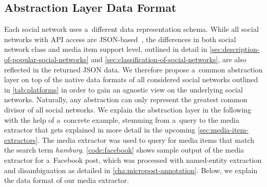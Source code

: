 \subsection{Abstraction Layer Data Format}
\label{sec:data-format}

Each social network uses a~different data representation schema.
While all social networks with API access are
JSON-based~\cite{crockford2006json}, the differences in both 
social network class and media item support level,
outlined in detail in
\autoref{sec:description-of-popular-social-networks} and
\autoref{sec:classification-of-social-networks},
are also reflected in the returned JSON data.
We therefore propose a~common abstraction layer 
on top of the native data formats of all considered social networks
outlined in \autoref{tab:platforms} in order to gain
an agnostic view on the underlying social networks.
Naturally, any abstraction can only represent the
greatest common divisor of all social networks.
We explain the abstraction layer in the following
with the help of a~concrete example,
stemming from a~query to the media extractor
that gets explained in more detail
in the upcoming \autoref{sec:media-item-extractors}.
The media extractor was used to query for media items
that match the search term \emph{hamburg}.
\autoref{code:facebook} shows sample output of the media extractor
for a~Facebook post, which was processed
with named-entity extraction and disambiguation 
as detailed in \autoref{cha:micropost-annotation}.
Below, we explain the data format of our media extractor.

